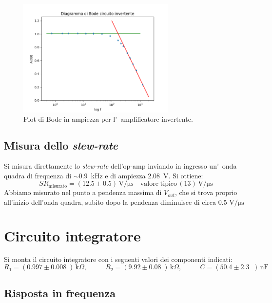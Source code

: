 \documentclass[10pt,a4paper]{article}
\newcommand{\exn}{\phantom{xxx}}
\begin{document}
	
	
	\begin{figure}[h]
		\begin{center}
			
			\includegraphics[width=0.7\textwidth]{bodeInvertente}
			\caption{\small Plot di Bode in ampiezza per l'~amplificatore invertente.}
			\label{fig:bodeinv}
		\end{center}
	\end{figure}
	\subsection{Misura dello \emph{slew-rate}}
	Si misura direttamente lo \emph{slew-rate} dell'op-amp inviando in ingresso un'~onda quadra 
	di frequenza di $\sim 0.9$~kHz e di ampiezza $2.08$~V. Si ottiene:
	\[
	SR_\mathrm{misurato} = (12.5 \pm 0.5 )\,\mathrm{V/\mu s} \quad \mathrm{valore \; tipico}\, (13 )\,\mathrm{V/\mu s}\
	\]
Abbiamo misurato nel  punto a pendenza massima di $V_{out}$, che si trova proprio all'inizio dell'onda quadra, subito dopo la pendenza diminuisce di circa 0.5 $ \mathrm{V/\mu s}$

	\section{Circuito integratore}
	Si monta il circuito integratore con i seguenti valori  dei componenti indicati: 
	\[
	R_1 = (0.997 \pm 0.008 \;) \,\mathrm{k}\Omega, \:\:\;\:\exn 
	R_2 = (9.92 \pm 0.08 \;) \,\mathrm{k}\Omega, \:\:\;\:\exn 
	C = (50.4 \pm 2.3 \;\;)\,\mathrm{nF}
	\]
	
	\subsection{Risposta in frequenza}
	
\end{document}
